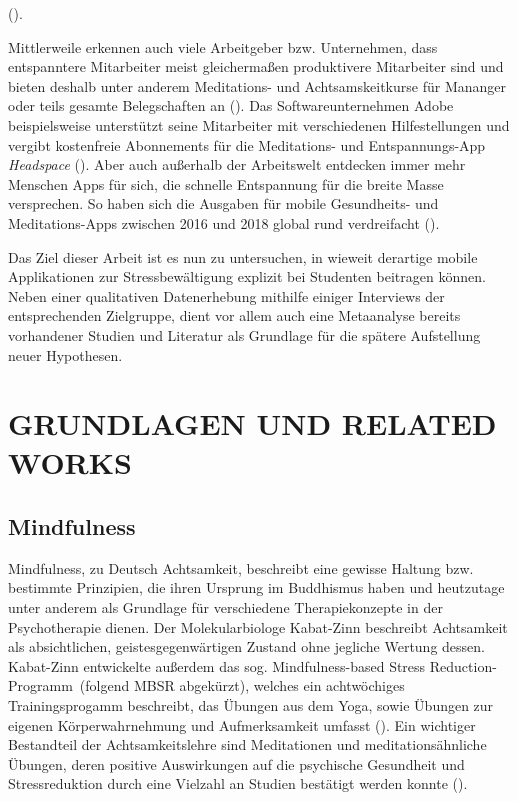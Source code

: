 \documentclass[10pt]{article}
\newcommand{\zit}[1]{(\cite{#1})}
\begin{document}
\zit{Stressbewältigung}.

Mittlerweile erkennen auch viele Arbeitgeber bzw. Unternehmen, dass entspanntere Mitarbeiter meist gleichermaßen produktivere Mitarbeiter sind und bieten deshalb unter anderem Meditations- und Achtsamskeitkurse für Mananger oder teils gesamte Belegschaften an \zit{Handelsblatt}. Das Softwareunternehmen Adobe beispielsweise unterstützt seine Mitarbeiter mit verschiedenen Hilfestellungen und vergibt kostenfreie Abonnements für die Meditations- und Entspannungs-App \textit{Headspace} \zit{Adobe}. 
Aber auch außerhalb der Arbeitswelt entdecken immer mehr Menschen Apps für sich, die schnelle Entspannung für die breite Masse versprechen. So haben sich die Ausgaben für mobile Gesundheits- und Meditations-Apps zwischen 2016 und 2018 global rund verdreifacht \zit{SteigendeNutzung}.

Das Ziel dieser Arbeit ist es nun zu untersuchen, in wieweit derartige mobile Applikationen zur Stressbewältigung explizit bei Studenten beitragen können.
Neben einer qualitativen Datenerhebung mithilfe einiger Interviews der entsprechenden Zielgruppe, dient vor allem auch eine Metaanalyse bereits vorhandener Studien und Literatur als Grundlage für die spätere Aufstellung neuer Hypothesen.
\bigbreak


\section{GRUNDLAGEN UND RELATED WORKS}

\subsection{Mindfulness}
Mindfulness, zu Deutsch Achtsamkeit, beschreibt eine gewisse Haltung bzw. bestimmte Prinzipien, die ihren Ursprung im Buddhismus haben und heutzutage unter anderem als Grundlage für verschiedene Therapiekonzepte in der Psychotherapie dienen. Der Molekularbiologe Kabat-Zinn beschreibt Achtsamkeit als absichtlichen, geistesgegenwärtigen Zustand ohne jegliche Wertung dessen. Kabat-Zinn entwickelte außerdem das sog. \grqq Mindfulness-based Stress Reduction-Programm\grqq\ (folgend MBSR abgekürzt), welches ein achtwöchiges Trainingsprogamm beschreibt, das Übungen aus dem Yoga, sowie Übungen zur eigenen Körperwahrnehmung und Aufmerksamkeit umfasst \zit{AchtsamkeitBasics}. Ein wichtiger Bestandteil der Achtsamkeitslehre sind Meditationen und meditationsähnliche Übungen, deren positive Auswirkungen auf die psychische Gesundheit und Stressreduktion durch eine Vielzahl an Studien bestätigt werden konnte \zit{MindfulnessStudy2}.
\end{document}

